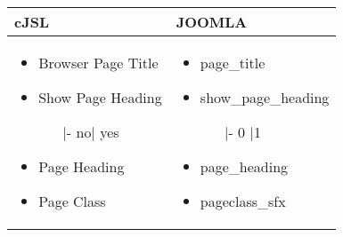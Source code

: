 \begin{minipage}{0.6\textwidth}
\begin{tabular}{|p{}|p{} |}
\hline
\textbf{cJSL} 
&  
\textbf{JOOMLA} \\ \hline
\begin{itemize}
\item Browser Page Title
	\item Show Page Heading
	\begin{enumerate}
	\item[|-]no| yes
	\end{enumerate}
	\item Page Heading
	\item Page Class
\end{itemize}
&
\begin{itemize}
	\item page\_title
	\item show\_page\_heading
	\begin{enumerate}
	\item[|-] 0 |1
	\end{enumerate}
	\item page\_heading
	\item pageclass\_sfx
\end{itemize} \\ \hline
\end{tabular}
\end{minipage}


